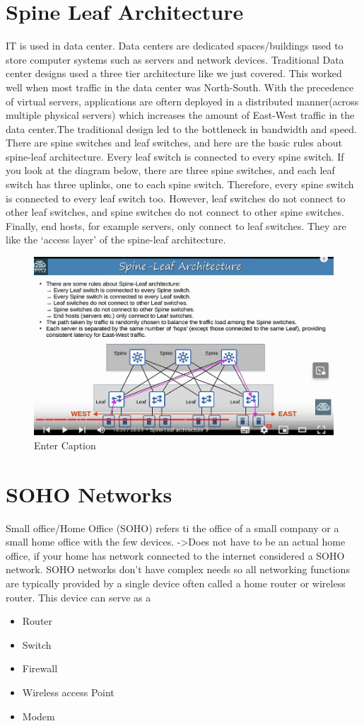 \documentclass{report}
\begin{document}
	\section{Spine Leaf Architecture}
	IT is used in data center. Data centers are dedicated spaces/buildings used to
	store computer systems such as servers and network devices. Traditional Data
	center designs used a three tier architecture like we just covered. This worked
	well when most traffic in the data center was North-South. With the precedence
	of virtual servers, applications are oftern deployed in a distributed manner(across
	multiple physical servers) which increases the amount of East-West traffic in
	the data center.The traditional design led to the bottleneck in bandwidth and
	speed. There are spine switches and leaf switches, and here are the basic
	rules about spine-leaf architecture. Every leaf switch is connected to every spine
	switch. If you look at the diagram below, there are three spine switches, and
	each leaf switch has three uplinks, one to each spine switch. Therefore, every
	spine switch is connected to every leaf switch too. However, leaf switches do not
	connect to other leaf switches, and spine switches do not connect to other
	spine switches. Finally, end hosts, for example servers, only connect to leaf
	switches. They are like the ‘access layer’ of the spine-leaf architecture.
	\begin{figure}
		\centering
		\includegraphics[width=0.5\linewidth]{spinceleaf.png}
		\caption{Enter Caption}
		\label{fig:enter-label}
	\end{figure}

	\section{SOHO Networks}

	Small office/Home Office (SOHO) refers ti the office of a small company or a
	small home office with the few devices. ->Does not have to be an actual home office,
	if your home has network connected to the internet considered a SOHO network. SOHO
	networks don't have complex needs so all networking functions are typically provided
	by a single device often called a home router or wireless router. This device
	can serve as a
	\begin{itemize}
		\item Router

		\item Switch

		\item Firewall

		\item Wireless access Point

		\item Modem
	\end{itemize}
\end{document}
